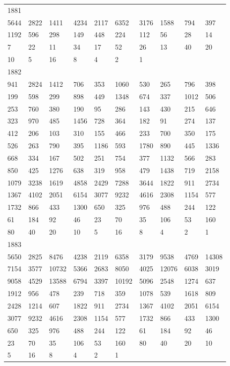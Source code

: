\begin{longtable}{*{10}{l}}
1881&&&&&&&&&\\
5644& 2822& 1411& 4234& 2117& 6352& 3176& 1588& 794& 397\\
1192& 596& 298& 149& 448& 224& 112& 56& 28& 14\\
7& 22& 11& 34& 17& 52& 26& 13& 40& 20\\
10& 5& 16& 8& 4& 2& 1& \\

1882&&&&&&&&&\\
941& 2824& 1412& 706& 353& 1060& 530& 265& 796& 398\\
199& 598& 299& 898& 449& 1348& 674& 337& 1012& 506\\
253& 760& 380& 190& 95& 286& 143& 430& 215& 646\\
323& 970& 485& 1456& 728& 364& 182& 91& 274& 137\\
412& 206& 103& 310& 155& 466& 233& 700& 350& 175\\
526& 263& 790& 395& 1186& 593& 1780& 890& 445& 1336\\
668& 334& 167& 502& 251& 754& 377& 1132& 566& 283\\
850& 425& 1276& 638& 319& 958& 479& 1438& 719& 2158\\
1079& 3238& 1619& 4858& 2429& 7288& 3644& 1822& 911& 2734\\
1367& 4102& 2051& 6154& 3077& 9232& 4616& 2308& 1154& 577\\
1732& 866& 433& 1300& 650& 325& 976& 488& 244& 122\\
61& 184& 92& 46& 23& 70& 35& 106& 53& 160\\
80& 40& 20& 10& 5& 16& 8& 4& 2& 1\\

1883&&&&&&&&&\\
5650& 2825& 8476& 4238& 2119& 6358& 3179& 9538& 4769& 14308\\
7154& 3577& 10732& 5366& 2683& 8050& 4025& 12076& 6038& 3019\\
9058& 4529& 13588& 6794& 3397& 10192& 5096& 2548& 1274& 637\\
1912& 956& 478& 239& 718& 359& 1078& 539& 1618& 809\\
2428& 1214& 607& 1822& 911& 2734& 1367& 4102& 2051& 6154\\
3077& 9232& 4616& 2308& 1154& 577& 1732& 866& 433& 1300\\
650& 325& 976& 488& 244& 122& 61& 184& 92& 46\\
23& 70& 35& 106& 53& 160& 80& 40& 20& 10\\
5& 16& 8& 4& 2& 1& \\


\end{longtable}
